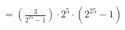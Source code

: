 \documentclass[preview]{standalone}
\begin{document}
\begin{align*}
= \left( \frac{3}{2^{25} - 1} \right) \cdot 2^5 \cdot (2^{25} - 1)
\end{align*}
\end{document}
